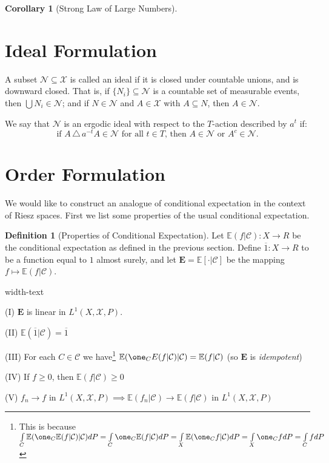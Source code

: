 \documentclass[letterpaper,10pt,oneside,onecolumn,reqno]{amsart}
\newcommand{\C}{\mathcal C}
\newcommand{\E}{\mathbb E}
\newcommand{\N}{\mathcal N}
\newcommand{\X}{\mathcal X}
\theoremstyle{definition}
\newtheorem{cor}[thm]{Corollary}
\newtheorem{defn}[thm]{Definition}
\renewcommand{\bar}[1]{\overline{#1}}
\begin{document}
		\begin{cor}[Strong Law of Large Numbers]
		
		\end{cor}

	\section{Ideal Formulation}

	A subset $\N \subseteq \X$ is called an ideal if it is closed under countable unions, and is downward closed. That is, if $\{ N_i \} \subseteq \N$ is a countable set of measurable events, then $\bigcup N_i \in \N$; and if $N \in \N$ and $A \in \X$ with $A \subseteq N$, then $A \in \N$.

	We say that $\N$ is an ergodic ideal with respect to the $T$-action described by $a^t$ if:
		$$\mbox{if $A \,\triangle\, a^{-t} A \in \N$ for all $t \in T$, then $A \in \N$ or $A^c \in \N$.}$$

\section{Order Formulation}
We would like to construct an analogue of conditional expectation in the context of Riesz spaces. First we list some properties of the usual conditional expectation.
\begin{defn}[Properties of Conditional Expectation]
Let $\E(f|\C) : X \to R$ be the conditional expectation as defined in the previous section. Define $\bar{1} : X \to R$ to be a function equal to $1$ almost surely, and let $\mathbf{E}=\E[\cdot|\C]$ be the mapping $f \mapsto \E(f|\C)$.
\begin{deflist}{width-text}
\item[(I)] $\mathbf{E}$ is linear in $L^1(X,\X,P)$. 
\item[(II)] $\E(\bar{1}|\C) = \bar{1}$
\item[(III)] For each $C \in \C$ we have\footnote{This is because $\int\limits_C\E(\one_C \E(f|\C)|\C)dP=\int\limits_C \one_C \E(f|\C)dP=\int\limits_X \E(\one_C f | \C)dP=\int\limits_X \one_C fdP=\int\limits_C fdP$ } $\E(\one_C E(f|\C)|\C) = \E(f|\C)$ (so $\mathbf{E}$ is \emph{idempotent}) 
\item[(IV)] If $f \geq 0$, then $\E(f|\C) \geq 0$
\item[(V)] $f_n \rightarrow f$ in $L^1(X,\X,P) \implies \E(f_n|\C) \rightarrow \E(f|\C)$ in $L^1(X,\X,P)$
\end{deflist}
\end{defn}
\end{document}

